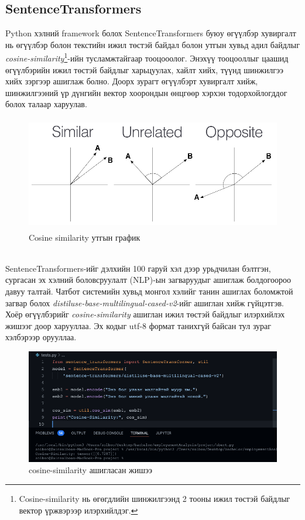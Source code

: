 \subsection{SentenceTransformers}
Python хэлний framework болох SentenceTransformers \cite{sentenceTransform} буюу өгүүлбэр хувиргалт нь өгүүлбэр болон текстийн ижил төстэй байдал болон утгын хувьд адил байдлыг \textit{cosine-similarity}\footnote{Cosine-similarity нь өгөгдлийн шинжилгээнд 2 тооны ижил төстэй байдлыг вектор үржвэрээр илэрхийлдэг.}-ийн тусламжтайгаар тооцооолог. Энэхүү тооцооллыг цаашид өгүүлбэрийн ижил төстэй байдлыг харьцуулах, хайлт хийх, түүнд шинжилгээ хийх зэргээр ашиглаж болно. Доорх зурагт өгүүлбэрт хувиргалт хийж, шинжилгээний үр дүнгийн вектор хоорондын өнцгөөр хэрхэн тодорхойлогддог болох талаар харуулав.
\begin{figure}[h]
  \centering
  \includegraphics*[height=5cm]{images/cosineSimilarity.png}
  \caption{Cosine similarity утгын график}
  \label{fig:cosineSimilarity}
\end{figure}
\\SentenceTransformers-ийг дэлхийн 100 гаруй хэл дээр урьдчилан бэлтгэн, сургасан эх хэлний боловсруулалт (NLP)-ын загваруудыг ашиглаж болдогоороо давуу талтай. Чатбот системийн хувьд монгол хэлийг танин ашиглах боломжтой загвар болох \textit{distiluse-base-multilingual-cased-v2}\cite{sbert}-ийг ашиглан хийж гүйцэтгэв.
\\Хоёр өгүүлбэрийг \textit{cosine-similarity} ашиглан ижил төстэй байдлыг илэрхийлэх жишээг доор харууллаа. Эх кодыг utf-8 формат танихгүй байсан тул зураг хэлбэрээр орууллаа.
\\
\begin{figure}[h]
  \includegraphics*[width=\textwidth]{images/sbert.png}
  \caption{cosine-similarity ашигласан жишээ}
  \label{fig:cosineSimilarityExample}
\end{figure}
